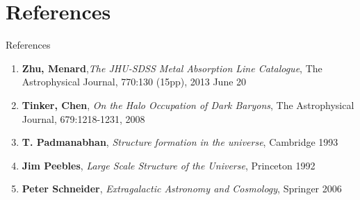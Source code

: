 \documentclass{beamer}
\begin{document}
\section{References}
		\begin{frame}{References}
			\begin{enumerate}
				\item \textbf{Zhu, Menard},\textit{The JHU-SDSS Metal Absorption Line Catalogue}, The Astrophysical Journal, 770:130 (15pp), 2013 June 20
				\item \textbf{Tinker, Chen}, \textit{On the Halo Occupation of Dark Baryons}, The Astrophysical Journal, 679:1218-1231, 2008
				\item \textbf{T. Padmanabhan}, \textit{Structure formation in the universe}, Cambridge 1993
				\item \textbf{Jim Peebles}, \textit{Large Scale Structure of the Universe}, Princeton 1992
				\item \textbf{Peter Schneider}, \textit{Extragalactic Astronomy and Cosmology}, Springer 2006
			\end{enumerate}
		\end{frame}
\end{document}
